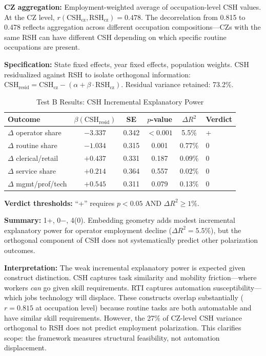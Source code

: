 \documentclass[12pt]{article}
\begin{document}
\textbf{CZ aggregation:} Employment-weighted average of occupation-level CSH values. At the CZ level, $r(\text{CSH}_{\text{cz}}, \text{RSH}_{\text{cz}}) = 0.478$. The decorrelation from 0.815 to 0.478 reflects aggregation across different occupation compositions---CZs with the same RSH can have different CSH depending on which specific routine occupations are present.

\textbf{Specification:} State fixed effects, year fixed effects, population weights. CSH residualized against RSH to isolate orthogonal information: $\text{CSH}_{\text{resid}} = \text{CSH}_{\text{cz}} - (\alpha + \beta \cdot \text{RSH}_{\text{cz}})$. Residual variance retained: 73.2\%.


\begin{table}[h!]
\centering
\caption{Test B Results: CSH Incremental Explanatory Power}
\label{tab:test-b-results}
\begin{tabular}{lccccl}
\toprule
\textbf{Outcome} & $\beta(\text{CSH}_{\text{resid}})$ & \textbf{SE} & \textbf{$p$-value} & $\Delta R^2$ & \textbf{Verdict} \\
\midrule
$\Delta$ operator share & $-3.337$ & 0.342 & $<0.001$ & 5.5\% & + \\
$\Delta$ routine share & $-1.034$ & 0.315 & 0.001 & 0.77\% & 0 \\
$\Delta$ clerical/retail & $+0.437$ & 0.331 & 0.187 & 0.09\% & 0 \\
$\Delta$ service share & $+0.214$ & 0.364 & 0.557 & 0.02\% & 0 \\
$\Delta$ mgmt/prof/tech & $+0.545$ & 0.311 & 0.079 & 0.13\% & 0 \\
\bottomrule
\end{tabular}
\end{table}

\textbf{Verdict thresholds:} ``+'' requires $p < 0.05$ AND $\Delta R^2 \geq 1\%$.

\textbf{Summary:} 1+, 0$-$, 4(0). Embedding geometry adds modest incremental explanatory power for operator employment decline ($\Delta R^2 = 5.5\%$), but the orthogonal component of CSH does not systematically predict other polarization outcomes.

\textbf{Interpretation:} The weak incremental explanatory power is expected given construct distinction. CSH captures task similarity and mobility friction---where workers \emph{can} go given skill requirements. RTI captures automation susceptibility---which jobs technology will displace. These constructs overlap substantially ($r = 0.815$ at occupation level) because routine tasks are both automatable and have similar skill requirements. However, the 27\% of CZ-level CSH variance orthogonal to RSH does not predict employment polarization. This clarifies scope: the framework measures structural feasibility, not automation displacement.
\end{document}
